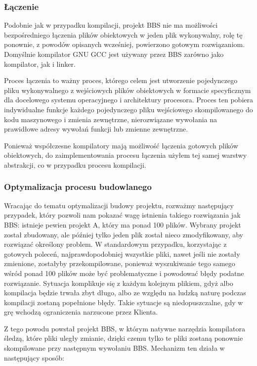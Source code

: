 \subsubsection{Łączenie}
Podobnie jak w przypadku kompilacji, projekt BBS nie ma możliwości bezpośredniego łączenia plików obiektowych w jeden plik wykonywalny, rolę tę ponownie, z powodów opisanych wcześniej, powierzono gotowym rozwiązaniom. Domyślnie kompilator GNU GCC jest używany przez BBS zarówno jako kompilator, jak i linker.

Proces łączenia to ważny proces, którego celem jest utworzenie pojedynczego pliku wykonywalnego z wejściowych plików obiektowych w formacie specyficznym dla docelowego systemu operacyjnego i architektury procesora. Proces ten pobiera indywidualne funkcje każdego pojedynczego pliku wejściowego skompilowanego do kodu maszynowego i zmienia zewnętrzne, nierozwiązane wywołania na prawidłowe adresy wywołań funkcji lub zmienne zewnętrzne.

Ponieważ współczesne kompilatory mają możliwość łączenia gotowych plików obiektowych, do zaimplementowania procesu łączenia użyłem tej samej warstwy abstrakcji, co w przypadku procesu kompilacji.

\subsubsection{Optymalizacja procesu budowlanego}
Wracając do tematu optymalizacji budowy projektu, rozważmy następujący przypadek, który pozwoli nam pokazać wagę istnienia takiego rozwiązania jak BBS: istnieje pewien projekt A, który ma ponad 100 plików. Wybrany projekt został zbudowany, ale później tylko jeden plik został nieco zmodyfikowany, aby rozwiązać określony problem. W standardowym przypadku, korzystając z gotowych poleceń, najprawdopodobniej wszystkie pliki, nawet jeśli nie zostały zmienione, zostałyby przekompilowane, ponieważ wyszukiwanie tego samego wśród ponad 100 plików może być problematyczne i powodować błędy podatne rozwiązanie. Sytuacja komplikuje się z każdym kolejnym plikiem, gdyż albo kompilacja będzie trwała zbyt długo, albo ze względu na ludzką naturę podczas kompilacji zostaną popełnione błędy. Takie sytuacje są niedopuszczalne, gdy w grę wchodzą ograniczenia narzucone przez Klienta.

Z tego powodu powstał projekt BBS, w którym natywne narzędzia kompilatora śledzą, które pliki uległy zmianie, dzięki czemu tylko te pliki zostaną ponownie skompilowane przy następnym wywołaniu BBS. Mechanizm ten działa w następujący sposób:

